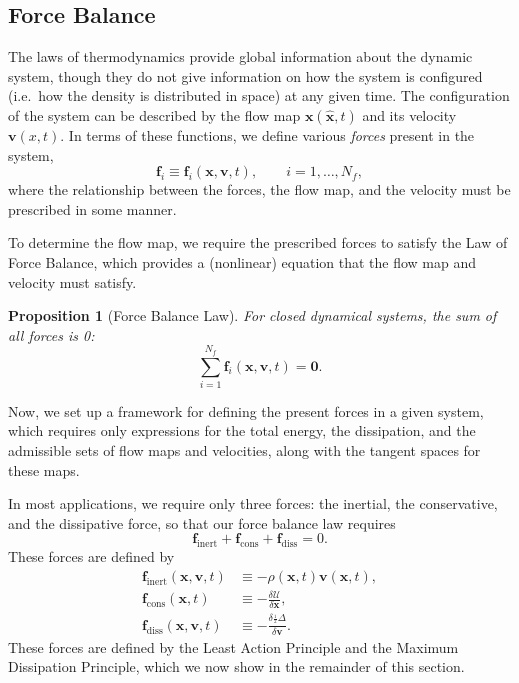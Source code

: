 \documentclass[final,10pt]{article}
\newtheorem{proposition}{Proposition}
\begin{document}
\subsection{Force Balance}
The laws of thermodynamics provide global information about the dynamic system, though they do not give information
on how the system is configured (i.e.~how the density is distributed in space) at any given time.
The configuration of the system can be described by the flow map $\bm x(\bm \hat{x},t)$ and its velocity $\bm v(x,t)$.
In terms of these functions, we define various \emph{forces} present in the system,
\[
	\bm f_i \equiv \bm f_i(\bm x,\bm v,t),	\qquad i=1,\ldots,N_f,
\]
where the relationship between the forces, the flow map, and the velocity must be prescribed in some manner.

To determine the flow map, we require the prescribed forces to satisfy the Law of Force Balance,
which provides a (nonlinear) equation that the flow map and velocity must satisfy.

\begin{proposition} [Force Balance Law]
For closed dynamical systems, the sum of all forces is 0:
\[
	\sum_{i=1}^{N_f} \bm f_i(\bm x,\bm v,t) = \bm{0}.
\]
\end{proposition}

Now, we set up a framework for defining the present forces in a given system,
which requires only expressions for the total energy, the dissipation, and the admissible sets of flow maps and velocities,
along with the tangent spaces for these maps.

In most applications, we require only three forces: the inertial, the conservative, and the dissipative force,
so that our force balance law requires
\[
	\bm f_\mathrm{inert} + \bm f_\mathrm{cons} + \bm f_\mathrm{diss} = 0.
\]
These forces are defined by
\begin{align}
	\bm f_\mathrm{inert}(\bm x, \bm v, t)	&\equiv	-\rho(\bm x, t) \bm v(\bm x, t),	\\
	\bm f_\mathrm{cons}(\bm x, t)		&\equiv	-\frac{\delta \mathcal{U}}{\delta \bm x},	\\
	\bm f_\mathrm{diss}(\bm x, \bm v, t)	&\equiv	-\frac{\delta \frac{_1}{^2} \Delta}{\delta \bm v}.
\end{align}
These forces are defined by the Least Action Principle and the Maximum Dissipation Principle,
which we now show in the remainder of this section.
\end{document}
